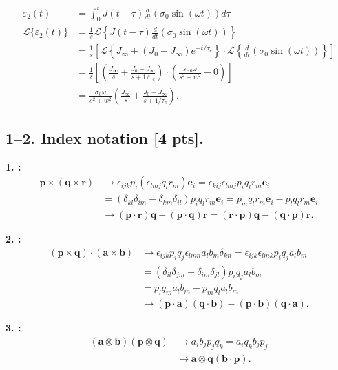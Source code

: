 \begin{align*}
    \varepsilon_2 (t) &= \int_0^t J(t-\tau) \frac{d}{d t}(\sigma_0 \sin(\omega t)) d\tau \\
    \mathcal{L}\{\varepsilon_2(t)\} &= \frac{1}{s} \mathcal{L} \left\{ J(t-\tau) \frac{d}{d t}(\sigma_0 \sin(\omega t)) \right\} \\
    &= \frac{1}{s} \left[ \mathcal{L} \left\{ J_\infty + (J_0 - J_\infty) e^{-t/\tau_c}\right\}
    \cdot \mathcal{L} \left\{ \frac{d}{dt}(\sigma_0 \sin(\omega t)) \right\}\right] \\
    &= \frac{1}{s} \left[ \left( \frac{J_\infty}{s} + \frac{J_0-J_\infty}{s+1/\tau_c} \right)
    \cdot \left( \frac{s\sigma_0 \omega}{s^2 + w^2} - 0 \right) \right]\\
    &= \boxed{\frac{\sigma_0 \omega}{s^2 + w^2} \left( \frac{J_\infty}{s} + \frac{J_0-J_\infty}{s+1/\tau_c} \right).}
\end{align*}

\newpage
\subsection*{1--2. \textbf{Index notation} [4 pts].}
\textbf{1. :}
\begin{align*}
    \bm{p} \times (\bm{q} \times \bm{r}) &\rightarrow \epsilon_{ijk} p_i (\epsilon_{lmj} q_l r_m)\bm{e}_i = \epsilon_{kij} \epsilon_{lmj} p_i q_l r_m \bm{e}_i\\
    &= (\delta_{kl} \delta_{im} - \delta_{km} \delta_{il}) p_i q_l r_m \bm{e}_i = p_m q_l r_m \bm{e}_i - p_l q_l r_m \bm{e}_i\\
    &\rightarrow \boxed{(\bm{p} \cdot \bm{r})\bm{q} - (\bm{p} \cdot \bm{q})\bm{r} = (\bm{r} \cdot \bm{p}) \bm{q} - (\bm{q} \cdot \bm{p}) \bm{r}.}
\end{align*}

\textbf{2. :}
\begin{align*}
    (\bm{p} \times \bm{q}) \cdot (\bm{a} \times \bm{b}) &\rightarrow \epsilon_{ijk} p_i q_j \epsilon_{lmn} a_l b_m \delta_{kn} = \epsilon_{ijk} \epsilon_{lmk} p_i q_j a_l b_m\\
    &= (\delta_{il} \delta_{jm} -\delta_{im}\delta_{jl}) p_i q_j a_l b_m \\
    &= p_l q_m a_l b_m - p_m q_l a_l b_m \\
    &\rightarrow \boxed{(\bm{p} \cdot \bm{a}) (\bm{q} \cdot \bm{b}) - (\bm{p} \cdot \bm{b}) (\bm{q} \cdot \bm{a}).}
\end{align*}

\textbf{3. :}
\begin{align*}
    (\bm{a} \otimes \bm{b})(\bm{p} \otimes \bm{q}) &\rightarrow a_i b_j p_j q_k = a_i q_k b_j p_j\\
    &\rightarrow \boxed{\bm{a} \otimes \bm{q} (\bm{b} \cdot \bm{p}).}
\end{align*}

